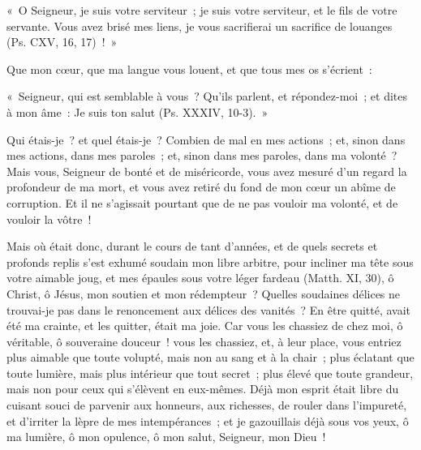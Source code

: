 \documentclass[french,twoside]{book} %
\newenvironment{quoteblock}%
  {\begin{quoting}}
  {\end{quoting}}
\newenvironment{quotebar}{%
    \def\FrameCommand{{\color{rubric!10!}\vrule width 0.5em} \hspace{0.9em}}%
    \def\OuterFrameSep{\itemsep} %
    \MakeFramed {\advance\hsize-\width \FrameRestore}
  }%
  {%
    \endMakeFramed
  }
\renewenvironment{quoteblock}%
  {%
    \savenotes
    \setstretch{0.9}
    \normalfont
    \begin{quotebar}
  }
  {%
    \end{quotebar}
    \spewnotes
  }
\begin{document}
\begin{quoteblock}
\noindent « O Seigneur, je suis votre serviteur ; je suis votre serviteur, et le fils de votre servante. Vous avez brisé mes liens, je vous sacrifierai un sacrifice de louanges (Ps. CXV, 16, 17) ! »\end{quoteblock}

\noindent Que mon cœur, que ma langue vous louent, et que tous mes os s’écrient :\par

\begin{quoteblock}
\noindent « Seigneur, qui est semblable à vous ? Qu’ils parlent, et répondez-moi ; et dites à mon âme : Je suis ton salut (Ps. XXXIV, 10-3). »\end{quoteblock}

\noindent Qui étais-je ? et quel étais-je ? Combien de mal en mes actions ; et, sinon dans mes actions, dans mes paroles ; et, sinon dans mes paroles, dans ma volonté ? Mais vous, Seigneur de bonté et de miséricorde, vous avez mesuré d’un regard la profondeur de ma mort, et vous avez retiré du fond de mon cœur un abîme de corruption. Et il ne s’agissait pourtant que de ne pas vouloir ma volonté, et de vouloir la vôtre !\par
Mais où était donc, durant le cours de tant d’années, et de quels secrets et profonds replis s’est exhumé soudain mon libre arbitre, pour incliner ma tête sous votre aimable joug, et mes épaules sous votre léger fardeau (Matth. XI, 30), ô Christ, ô Jésus, mon soutien et mon rédempteur ? Quelles soudaines délices ne trouvai-je pas dans le renoncement aux délices des vanités ? En être quitté, avait été ma crainte, et les quitter, était ma joie. Car vous les chassiez de chez moi, ô véritable, ô souveraine douceur ! vous les chassiez, et, à leur place, vous entriez plus aimable que toute volupté, mais non au sang et à la chair ; plus éclatant que toute lumière, mais plus intérieur que tout secret ; plus élevé que toute grandeur, mais non pour ceux qui s’élèvent en eux-mêmes. Déjà mon esprit était libre du cuisant souci de parvenir aux honneurs, aux richesses, de rouler dans l’impureté, et d’irriter la lèpre de mes intempérances ; et je gazouillais déjà sous vos yeux, ô ma lumière, ô mon opulence, ô mon salut, Seigneur, mon Dieu !
\end{document}
